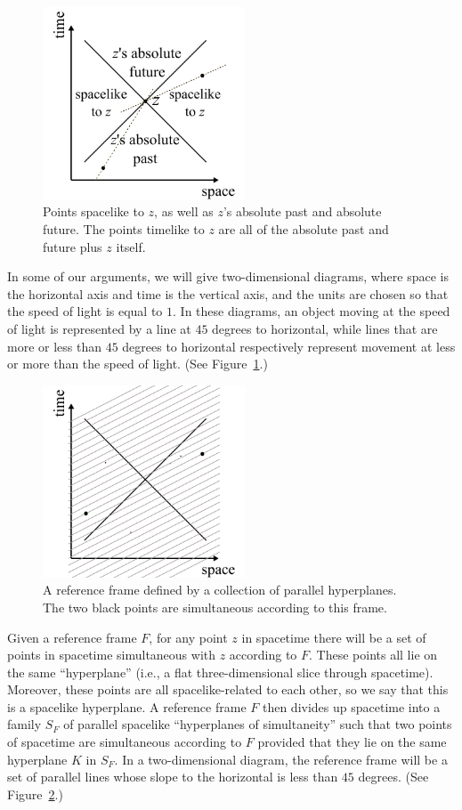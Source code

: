 \begin{figure}\label{fig:relativity-diagram}
\includegraphics[width=6cm]{relativity-diagram.pdf}
\caption{Points spacelike to $z$, as well as $z$'s absolute past and absolute future. The 
points timelike to $z$ are all of the absolute past and future plus $z$ itself.}
\end{figure}
In some of our arguments, we will give two-dimensional diagrams, where space is the horizontal axis and time
is the vertical axis, and the units are chosen so that the speed of light is equal to $1$. In these diagrams,
an object moving at the speed of light is represented by a line at $45$ degrees to horizontal, while 
lines that are more or less than $45$ degrees to horizontal respectively represent movement at less or more
than the speed of light. (See Figure~\ref{fig:relativity-diagram}.)

\begin{figure}\label{fig:simultaneity}
\includegraphics[width=6cm]{simultaneity.pdf}
\caption{A reference frame defined by a collection of parallel hyperplanes. The two black points are simultaneous
according to this frame.}
\end{figure}
Given a reference frame $F$, for any point $z$ in spacetime there will be a set of points in spacetime simultaneous 
with $z$ according to $F$. These points all lie on the same ``hyperplane'' (i.e., a flat three-dimensional slice 
through spacetime). Moreover, these points are all spacelike-related to each other, so we say that this is a 
spacelike hyperplane. A reference frame $F$ then divides up spacetime into a family $S_F$ of parallel spacelike 
``hyperplanes of simultaneity'' such that two points of spacetime are simultaneous according to $F$ provided that they lie on the 
same hyperplane $K$ in $S_F$. In a two-dimensional diagram, the reference frame will be a set of parallel lines
whose slope to the horizontal is less than $45$ degrees. (See Figure~\ref{fig:simultaneity}.)

